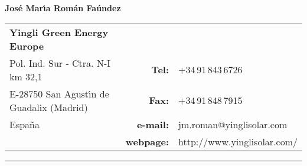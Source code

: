 \documentclass{article}
\begin{document}

{\huge \bf  Jos\'e Mar\'{\i}a Rom\'an Fa\'undez}

\bigskip \medskip

\begin{tabular}{lrl}
{\bf Yingli Green Energy Europe} & & {\medskip} \\
{\small Pol. Ind. Sur - Ctra. N-I km 32,1}
   & {\small {\bf Tel:}} & {\small +34\,91\,843\,6726} \\
{\small E-28750 San Agust\'{\i}n de Guadalix (Madrid)}
   & {\small {\bf Fax:}} & {\small +34\,91\,848\,7915} \\
{\small Espa\~na}
   & {\small {\bf e-mail:}} & {\small jm.roman@yinglisolar.com} \\
{\small }
   & {\small {\bf webpage:}} & {\small http://www.yinglisolar.com/}
\end{tabular}

\bigskip

\hrule


\end{document}
